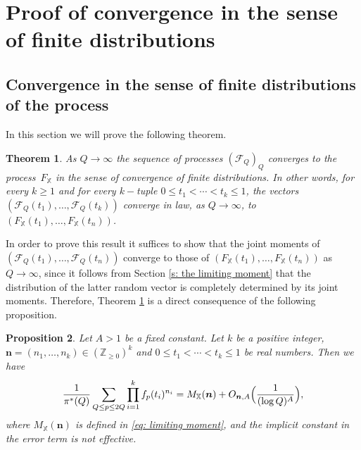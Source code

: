 \documentclass[10pt]{amsart}
\theoremstyle{plain}
\newtheorem{thm}{Theorem}[section]
\newtheorem{pro}[thm]{Proposition}
\theoremstyle{definition}
\newcommand{\X}{\mathbb{X}}
\begin{document}
\section{Proof of convergence in the sense of finite distributions}\label{s: proof of convergence in finite distributions real}

\subsection{Convergence in the sense of finite distributions of the process} In this section we will prove the following theorem.
\begin{thm}\label{thm: convergence in finite distribution}
As $Q\to \infty$ the sequence of processes $(\mathcal{F}_{Q})_Q$ converges to the process~$F_{\X}$ in the sense of convergence of finite distributions.
In other words, for every $k \geq 1$ and for every $k-$tuple $0 \leq t_1 < \cdots < t_k \leq 1$, the vectors
$ (\mathcal{F}_{Q}(t_1), \dots, \mathcal{F}_{Q}(t_k))
$
converge in law, as $Q \rightarrow \infty$, to
$(F_{\X}(t_1), \dots, F_{\X}(t_n))$.
\end{thm}

In order to prove this result it suffices to show that the joint moments of $(\mathcal{F}_{Q}(t_1), \dots, \mathcal{F}_{Q}(t_n))$ converge to those of $(F_{\X}(t_1), \dots, F_{\X}(t_n))$ as $Q\to \infty$, since it follows from Section \ref{s: the limiting moment} that the distribution of the latter random vector is completely determined by its joint moments. Therefore, Theorem \ref{thm: convergence in finite distribution} is a direct consequence of the following proposition.

\begin{pro}\label{thm: moments theorem}
Let $A>1$ be a fixed constant. Let $k$ be a positive integer, $\boldsymbol{n} = (n_1, \dots, n_k)\in (\mathbb{Z}_{\geq 0})^k$ and $0 \leq t_1 < \cdots < t_k \leq 1$ be real numbers. Then we have
\begin{equation}\label{AsymptoticMomentsMQ}
\frac{1}{\pi^*(Q)} \sum_{Q\leq p \leq 2Q} \prod_{i =1}^k f_{p}(t_i)^{n_i}= M_{\X}(\boldsymbol{n}) + O_{\boldsymbol{n}, A}\Bigl(\frac{1}{(\log Q)^{A}}\Bigr),
\end{equation}
where $M_{\X}(\boldsymbol{n})$ is defined in \eqref{eq: limiting moment}, and the implicit constant in the error term is not effective.
\end{pro}
\end{document}
